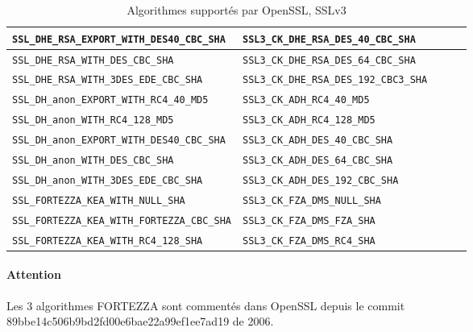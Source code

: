 \begin{table}[H]
\begin{tabularx}{17cm}{|l|X|l|X|l|}
\hline
\verb+SSL_DHE_RSA_EXPORT_WITH_DES40_CBC_SHA+ & \verb+SSL3_CK_DHE_RSA_DES_40_CBC_SHA+\\
\hline
\verb+SSL_DHE_RSA_WITH_DES_CBC_SHA+ & \verb+SSL3_CK_DHE_RSA_DES_64_CBC_SHA+\\
\hline
\verb+SSL_DHE_RSA_WITH_3DES_EDE_CBC_SHA+ & \verb+SSL3_CK_DHE_RSA_DES_192_CBC3_SHA+\\
\hline 
\verb+SSL_DH_anon_EXPORT_WITH_RC4_40_MD5+ & \verb+SSL3_CK_ADH_RC4_40_MD5+\\
\hline
\verb+SSL_DH_anon_WITH_RC4_128_MD5+ & \verb+SSL3_CK_ADH_RC4_128_MD5+\\
\hline
\verb+SSL_DH_anon_EXPORT_WITH_DES40_CBC_SHA+ & \verb+SSL3_CK_ADH_DES_40_CBC_SHA+\\
\hline
\verb+SSL_DH_anon_WITH_DES_CBC_SHA+& \verb+SSL3_CK_ADH_DES_64_CBC_SHA+\\
\hline
\verb+SSL_DH_anon_WITH_3DES_EDE_CBC_SHA+ & \verb+SSL3_CK_ADH_DES_192_CBC_SHA+\\
\hline
\verb+SSL_FORTEZZA_KEA_WITH_NULL_SHA+ & \verb+SSL3_CK_FZA_DMS_NULL_SHA+\\
\hline
\verb+SSL_FORTEZZA_KEA_WITH_FORTEZZA_CBC_SHA+ & \verb+SSL3_CK_FZA_DMS_FZA_SHA+\\
\hline
\verb+SSL_FORTEZZA_KEA_WITH_RC4_128_SHA+ & \verb+SSL3_CK_FZA_DMS_RC4_SHA+\\
\hline
\end{tabularx}
\caption{Algorithmes supportés par OpenSSL, SSLv3}
\label{algosOpensslV3}
\end{table}

\paragraph{Attention} Les 3 algorithmes FORTEZZA sont commentés dans OpenSSL depuis le commit\\
 89bbe14c506b9bd2fd00e6bae22a99ef1ee7ad19 de 2006.
 
